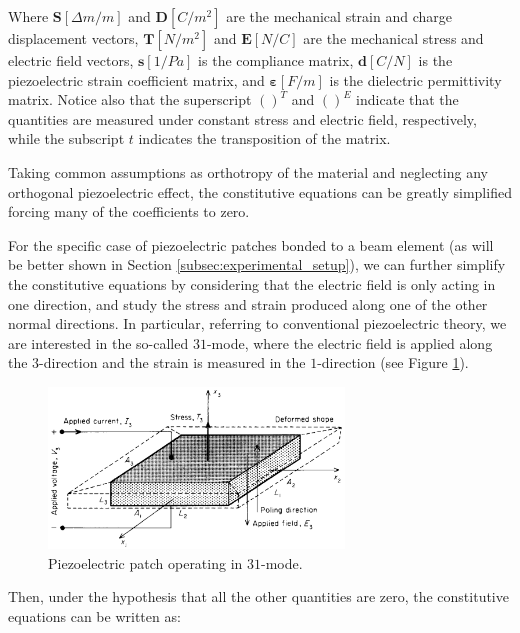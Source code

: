 Where $\bm{S} [\Delta m / m]$ and $\bm{D} [C / m^2]$ are the mechanical strain and charge displacement vectors, $\bm{T} [N / m^2]$ and $\bm{E} [N / C]$ are the mechanical stress and electric field vectors, $\bm{s} [1 / Pa]$ is the compliance matrix, $\bm{d} [C / N]$ is the piezoelectric strain coefficient matrix, and $\bm{\varepsilon} [F / m]$ is the dielectric permittivity matrix.
Notice also that the superscript $()^T$ and $()^E$ indicate that the quantities are measured under constant stress and electric field, respectively, while the subscript $t$ indicates the transposition of the matrix.

Taking common assumptions as orthotropy of the material and neglecting any orthogonal piezoelectric effect, the constitutive equations can be greatly simplified forcing many of the coefficients to zero.

For the specific case of piezoelectric patches bonded to a beam element (as will be better shown in Section \ref{subsec:experimental_setup}), we can further simplify the constitutive equations by considering that the electric field is only acting in one direction, and study the stress and strain produced along one of the other normal directions.
In particular, referring to conventional piezoelectric theory, we are interested in the so-called $31$-mode, where the electric field is applied along the $3$-direction and the strain is measured in the $1$-direction (see Figure \ref{fig:piezo_31_operating_mode}).

\begin{figure}[H]
    \centering
    \includegraphics[width=0.7\textwidth]{img/piezo_31_operating_mode.png}
    \caption{Piezoelectric patch operating in $31$-mode.}
    \label{fig:piezo_31_operating_mode}
\end{figure}

Then, under the hypothesis that all the other quantities are zero, the constitutive equations can be written as:

